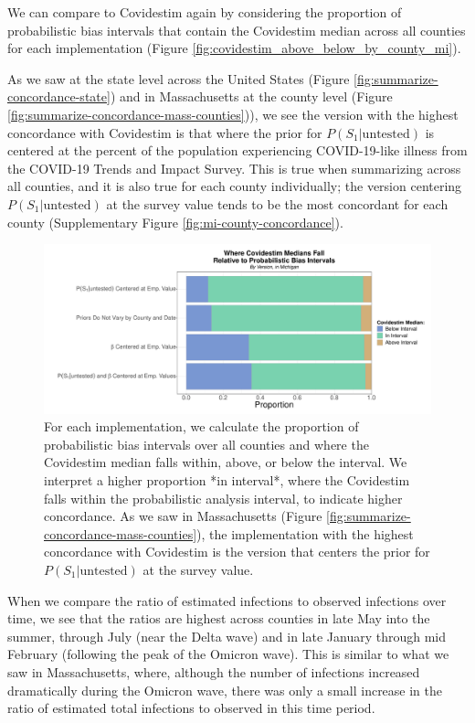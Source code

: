 \documentclass[12pt,twoside]{smiththesis}
\begin{document}
We can compare to Covidestim again by considering the proportion of probabilistic bias intervals that contain the Covidestim median across all counties for each implementation (Figure \ref{fig:covidestim_above_below_by_county_mi}).

As we saw at the state level across the United States (Figure \ref{fig:summarize-concordance-state}) and in
Massachusetts at the county level (Figure \ref{fig:summarize-concordance-mass-counties})), we see the version with the highest concordance with Covidestim is that where the prior for \(P(S_1|\text{untested})\) is centered at the percent of the population experiencing COVID-19-like illness from the COVID-19 Trends and Impact Survey. This is true when summarizing across all counties, and it is also true for each county individually; the version centering \(P(S_1|\text{untested})\) at the survey value tends to be the most concordant for each county (Supplementary Figure \ref{fig:mi-county-concordance}).
\begin{figure}
\includegraphics[width=1\linewidth]{figure/summarize-concordance-mich-counties} \caption{\label{fig:covidestim_above_below_by_county_mi} For each implementation, we calculate the proportion of probabilistic bias intervals over all counties and where the Covidestim median falls within, above, or below the interval. We interpret a higher proportion *in interval*, where the Covidestim falls within the probabilistic analysis interval, to indicate higher concordance. As we saw in Massachusetts (Figure \ref{fig:summarize-concordance-mass-counties}), the implementation with the highest concordance with Covidestim is the version that centers the prior for $P(S_1|\text{untested})$ at the survey value.}\label{fig:unnamed-chunk-83}
\end{figure}
When we compare the ratio of estimated infections to observed infections over time, we see that the ratios are highest across counties in late May into the summer, through July (near the Delta wave) and in late January through mid February (following the peak of the Omicron wave). This is similar to what we saw in Massachusetts, where, although the number of infections increased dramatically during the Omicron wave, there was only a small increase in the ratio of estimated total infections to observed in this time period.
\end{document}
